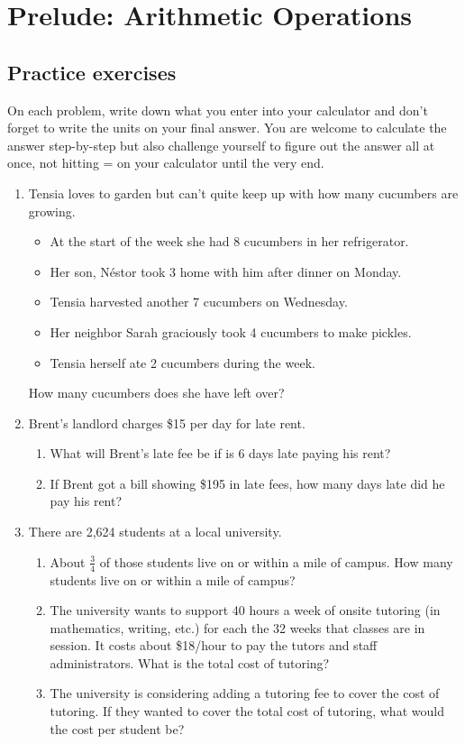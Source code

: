 
\section{Prelude: Arithmetic Operations} 

\subsection*{Practice exercises}

On each problem, write down what you enter into your calculator and don't forget to write the units on your final answer. You are welcome to calculate the answer step-by-step but also challenge yourself to figure out the answer all at once, not hitting = on your calculator until the very end.

\begin{enumerate}

\item Tensia loves to garden but can't quite keep up with how many cucumbers are growing.  
\begin{itemize}
\item At the start of the week she had 8 cucumbers in her refrigerator. 
\item Her son, N\'estor took 3 home with him after dinner on Monday.  
\item Tensia harvested another 7 cucumbers on Wednesday.  
\item Her neighbor Sarah graciously took 4 cucumbers to make pickles.  
\item Tensia herself ate 2 cucumbers during the week.  
\end{itemize}
How many cucumbers does she have left over?  \vfill

\item Brent's landlord charges \$15 per day for late rent.
\begin{enumerate} 
\item What will Brent's late fee be if is 6 days late paying his rent? 
\vfill  
\item If Brent got a bill showing \$195 in late fees, how many days late did he pay his rent? 
\vfill
\end{enumerate}

\newpage 

\item There are 2,624 students at a local university.

\begin{enumerate}
\item About $\frac{3}{4}$ of those students live on or within a mile of campus. How many students live on or within a mile of campus?   
\vfill 
\item The university wants to support 40 hours a week of onsite tutoring (in mathematics, writing, etc.) for each the 32 weeks that classes are in session.  It costs about \$18/hour to pay the tutors and staff administrators.  What is the total cost of tutoring? 
\vfill
\item The university is considering adding a tutoring fee to cover the cost of tutoring.  If they wanted to cover the total cost of tutoring, what would the cost per student be?
\vfill
\end{enumerate}



\end{enumerate}
